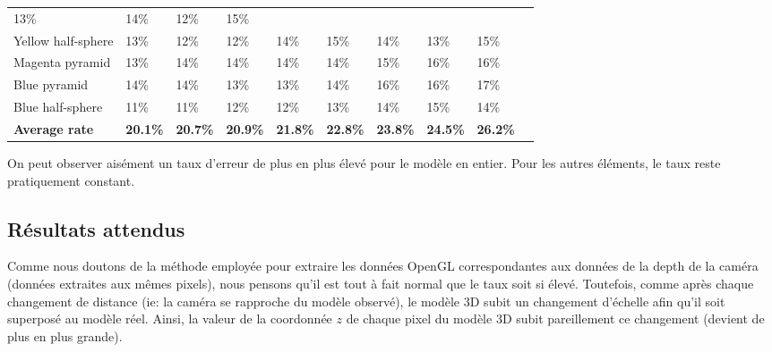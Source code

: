 \documentclass[a4paper, 12pt]{book}
\begin{document}
\begin{table}[H]
\begin{tabular}{c|lllllllll}
\multicolumn{1}{l|}{13\%}  & 
\multicolumn{1}{l|}{14\%}  & 
\multicolumn{1}{l|}{12\%}  & 
\multicolumn{1}{l|}{15\%}  & \\ 
\cline{1-9}
\multicolumn{1}{|l|}{Yellow half-sphere}  & 
\multicolumn{1}{l|}{13\%}  & 
\multicolumn{1}{l|}{12\%}  & 
\multicolumn{1}{l|}{12\%}  &  
\multicolumn{1}{l|}{14\%}  & 
\multicolumn{1}{l|}{15\%}  & 
\multicolumn{1}{l|}{14\%}  & 
\multicolumn{1}{l|}{13\%}  & 
\multicolumn{1}{l|}{15\%}  & 
\\ 
\cline{1-9}
\multicolumn{1}{|l|}{Magenta pyramid}  & 
\multicolumn{1}{l|}{13\%}  & 
\multicolumn{1}{l|}{14\%}  & 
\multicolumn{1}{l|}{14\%}  &  
\multicolumn{1}{l|}{14\%}  & 
\multicolumn{1}{l|}{14\%}  & 
\multicolumn{1}{l|}{15\%}  & 
\multicolumn{1}{l|}{16\%}  & 
\multicolumn{1}{l|}{16\%}  & \\ 
\cline{1-9}
\multicolumn{1}{|l|}{Blue pyramid}  & 
\multicolumn{1}{l|}{14\%}  & 
\multicolumn{1}{l|}{14\%}  & 
\multicolumn{1}{l|}{13\%}  &  
\multicolumn{1}{l|}{13\%}  & 
\multicolumn{1}{l|}{14\%}  & 
\multicolumn{1}{l|}{16\%}  & 
\multicolumn{1}{l|}{16\%}  & 
\multicolumn{1}{l|}{17\%}  & \\ 
\cline{1-9}
\multicolumn{1}{|l|}{Blue  half-sphere}  & 
\multicolumn{1}{l|}{11\%}  & 
\multicolumn{1}{l|}{11\%}  & 
\multicolumn{1}{l|}{12\%}  &  
\multicolumn{1}{l|}{12\%}  & 
\multicolumn{1}{l|}{13\%}  & 
\multicolumn{1}{l|}{14\%}  & 
\multicolumn{1}{l|}{15\%}  & 
\multicolumn{1}{l|}{14\%}  & \\ 
\cline{1-9}
\multicolumn{1}{|l|}{\textbf{Average rate}} & 
\multicolumn{1}{l|}{\textbf{20.1\%}}  & 
\multicolumn{1}{l|}{\textbf{20.7\%}}  &  
\multicolumn{1}{l|}{\textbf{20.9\%}}  & 
\multicolumn{1}{l|}{\textbf{21.8\%}}  & 
\multicolumn{1}{l|}{\textbf{22.8\%}}  & 
\multicolumn{1}{l|}{\textbf{23.8\%}}  & 
\multicolumn{1}{l|}{\textbf{24.5\%}}  &  
\multicolumn{1}{l|}{\textbf{26.2\%}}  &\\ 
\cline{1-9}

\end{tabular}
\end{table}

\vspace{2cm} 
\par On peut observer aisément un taux d'erreur de plus en plus élevé pour le modèle en entier. Pour les autres éléments, le taux reste pratiquement constant. 

\subsection{Résultats attendus}
Comme nous doutons de la méthode employée pour extraire les données OpenGL correspondantes aux données de la depth de la caméra (données extraites aux mêmes pixels), nous pensons qu'il est tout à fait normal que le taux soit si élevé. Toutefois, comme après chaque changement de distance (ie: la caméra se rapproche du modèle observé), le modèle 3D subit un changement d'échelle afin qu'il soit superposé au modèle réel. Ainsi, la valeur de la coordonnée $z$ de chaque pixel du modèle 3D subit pareillement ce changement (devient de plus en plus grande).
\end{document}
